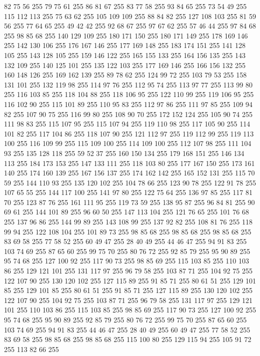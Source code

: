 82 75 56 255 79 75 61 255 86 81 67 255 83 77 58 255 93 84 65 255 73 54 49 255 115 112 113 255 75 63 62 255 105 109 109 255 88 84 82 255 127 108 103 255 81 59 56 255 77 64 65 255 49 42 42 255 92 68 67 255 97 67 62 255 57 46 44 255 97 84 68 255 98 85 68 255 140 129 109 255 180 171 150 255 180 171 149 255 178 169 146 255 142 130 106 255 176 167 146 255 177 169 148 255 183 174 151 255 141 128 105 255 143 128 105 255 159 146 122 255 165 155 133 255 164 156 135 255 143 132 109 255 140 125 101 255 135 122 103 255 177 169 146 255 166 156 132 255 160 148 126 255 169 162 139 255 89 78 62 255 124 99 72 255 103 79 53 255 158 131 101 255 132 119 98 255 114 97 76 255 112 95 74 255 113 97 77 255 113 99 80 255 116 103 85 255 118 104 88 255 118 106 95 255 122 110 99 255 119 106 95 255 116 102 90 255 115 101 89 255 110 95 83 255 112 97 86 255 111 97 85 255 109 94 82 255 107 90 75 255 116 99 80 255 108 90 70 255 172 152 124 255 105 90 74 255
111 98 83 255 115 107 95 255 115 107 94 255 119 110 98 255 117 105 90 255 114 101 82 255 117 104 86 255 118 107 90 255 121 112 97 255 119 112 99 255 119 113 100 255 116 109 99 255 115 109 100 255 114 109 100 255 112 107 98 255 111 104 93 255 135 128 118 255 59 52 37 255 160 150 134 255 179 168 151 255 146 134 113 255 184 173 153 255 147 133 111 255 118 103 80 255 177 167 150 255 173 161 140 255 174 160 139 255 167 156 137 255 174 162 142 255 165 152 131 255 115 70 59 255 144 110 93 255 135 120 102 255 104 78 66 255 123 90 78 255 122 91 78 255 107 65 55 255 144 117 100 255 141 97 80 255 122 75 64 255 136 97 85 255 117 81 70 255 123 87 76 255 161 111 95 255 119 73 59 255 138 95 87 255 96 84 81 255 90 69 61 255 144 101 89 255 96 60 50 255 147 113 104 255 121 76 65 255 101 76 68 255 137 96 86 255 144 99 89 255 143 108 99 255 137 92 82 255 108 81 76 255 118 99 94 255 122 108 104 255 101 89 73 255 98 85 68 255 98 85 68 255 98 85 68 255
83 69 58 255 77 58 52 255 60 49 47 255 28 40 49 255 44 46 47 255 94 91 83 255 103 74 69 255 87 65 60 255 99 75 70 255 80 76 72 255 92 85 79 255 95 90 89 255 95 74 68 255 127 100 92 255 117 90 73 255 98 85 69 255 115 103 85 255 110 103 86 255 129 121 101 255 131 117 97 255 96 79 58 255 103 87 71 255 104 92 75 255 122 107 90 255 130 120 102 255 127 115 89 255 91 85 71 255 80 61 51 255 129 101 85 255 129 101 85 255 80 61 51 255 91 85 71 255 127 115 89 255 130 120 102 255 122 107 90 255 104 92 75 255 103 87 71 255 96 79 58 255 131 117 97 255 129 121 101 255 110 103 86 255 115 103 85 255 98 85 69 255 117 90 73 255 127 100 92 255 95 74 68 255 95 90 89 255 92 85 79 255 80 76 72 255 99 75 70 255 87 65 60 255 103 74 69 255 94 91 83 255 44 46 47 255 28 40 49 255 60 49 47 255 77 58 52 255 83 69 58 255 98 85 68 255 98 85 68 255 115 100 80 255 129 115 94 255 105 91 72 255 113 82 66 255
